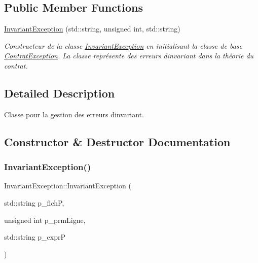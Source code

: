 \subsection*{Public Member Functions}
\begin{DoxyCompactItemize}
\item 
\hyperlink{classInvariantException_af8a1950834b26c256db0b11eb33e6056}{Invariant\+Exception} (std\+::string, unsigned int, std\+::string)
\begin{DoxyCompactList}\small\item\em Constructeur de la classe \hyperlink{classInvariantException}{Invariant\+Exception} en initialisant la classe de base \hyperlink{classContratException}{Contrat\+Exception}. La classe représente des erreurs d\textquotesingle{}invariant dans la théorie du contrat. \end{DoxyCompactList}\end{DoxyCompactItemize}


\subsection{Detailed Description}
Classe pour la gestion des erreurs d\textquotesingle{}invariant. 

\subsection{Constructor \& Destructor Documentation}
\mbox{\label{classInvariantException_af8a1950834b26c256db0b11eb33e6056}} 
\subsubsection{\texorpdfstring{Invariant\+Exception()}{InvariantException()}}
{\footnotesize\ttfamily Invariant\+Exception\+::\+Invariant\+Exception (\begin{DoxyParamCaption}\item[{std\+::string}]{p\+\_\+fichP,  }\item[{unsigned int}]{p\+\_\+prm\+Ligne,  }\item[{std\+::string}]{p\+\_\+exprP }\end{DoxyParamCaption})}



